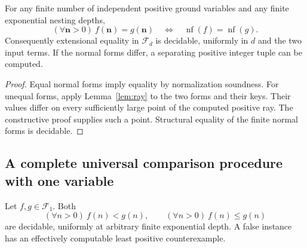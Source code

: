 \documentclass[11pt]{article}
\begin{document}
\begin{theorem}\label{thm:identity}
For any finite number of independent positive ground variables and any
finite exponential nesting depths,
\[
  (\forall\mathbf n>0)\ f(\mathbf n)=g(\mathbf n)
       \quad\Longleftrightarrow\quad
  \operatorname{nf}(f)=\operatorname{nf}(g).                 \tag{N4}
\]
Consequently extensional equality in $\mathcal F_d$ is decidable,
uniformly in $d$ and the two input terms.  If the normal forms differ,
a separating positive integer tuple can be computed.
\end{theorem}
\begin{proof}
Equal normal forms imply equality by normalization soundness.  For
unequal forms, apply Lemma~\ref{lem:ray} to the two forms and their
keys.  Their values differ on every sufficiently large point of the
computed positive ray.  The constructive proof supplies such a point.
Structural equality of the finite normal forms is decidable.
\end{proof}

\subsection{A complete universal comparison procedure with one variable}

\begin{theorem}\label{thm:unary}
Let $f,g\in\mathcal F_1$.  Both
\[
                 (\forall n>0)\ f(n)<g(n),\qquad
                 (\forall n>0)\ f(n)\le g(n)                \tag{N5}
\]
are decidable, uniformly at arbitrary finite exponential depth.
A false instance has an effectively computable least positive
counterexample.
\end{theorem}
\end{document}

